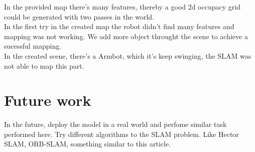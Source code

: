 \documentclass[10pt,journal,compsoc]{IEEEtran}
\begin{document}
In the provided map there's many features, thereby a good 2d occupacy grid could be generated with two passes in the
world.\\
In the first try in the created map the robot didn't find many features and mapping was not working. We add more object
throught the scene to achieve a sucessful mapping.\\
In the created scene, there's a Armbot, which it's keep swinging, the SLAM was not able to map this part.

 
\section{Future work}

    In the future, deploy the model in a real world and perfome similar task performed here.
    Try different algorithms to the SLAM problem. Like Hector SLAM, ORB-SLAM, something similar to this article\cite{VehicularTechnologySociety2017}.


\nocite{*}


\end{document}
